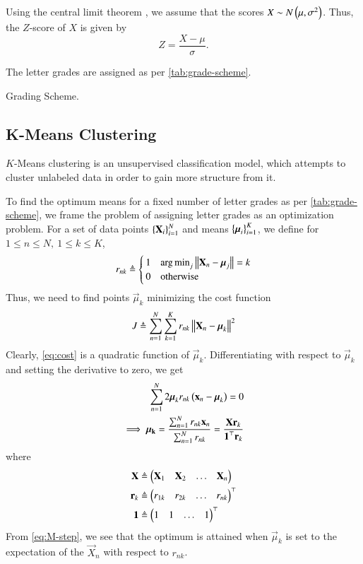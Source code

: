 \documentclass[conference]{IEEEtran}
\DeclareMathOperator*{\argmin}{arg\,min}
\begin{document}
Using the central limit theorem \cite{spiegelSchaumsOutlineStatistics2018}, we
assume that the scores $X \sim N\left(\mu,\sigma^2\right)$. Thus, the $Z$-score of $X$
is given by
\begin{equation}
    Z = \frac{X-\mu}{\sigma}.
\end{equation}

The letter grades are assigned as per \autoref{tab:grade-scheme}.
\begin{table}[!ht]
    \centering
    
    \caption{Grading Scheme.}
    \label{tab:grade-scheme}
\end{table}

\subsection{K-Means Clustering}
$K$-Means clustering is an unsupervised classification model, which attempts to
cluster unlabeled data in order to gain more structure from it. 

To find the optimum means for a fixed number of letter grades as per
\autoref{tab:grade-scheme}, we frame the problem of assigning letter grades as
an optimization problem. For a set of data points $\left\{\boldsymbol{\mathbf{X}}_i\right\}_{i=1}^N$
and means $\left\{\boldsymbol{\mathbf{\mu}}_i\right\}_{i=1}^K$, we define for $1 \le n \le N,\ 1 \le k
\le K$,
\begin{equation}
    r_{nk} \triangleq
    \begin{cases}
        1 & \argmin_{j}\norm{\vec{X}_n-\vec{\mu}_j} = k \\
        0 & \textrm{otherwise}
    \end{cases}
    \label{eq:rnk-def}
\end{equation}
Thus, we need to find points $\vec{\mu}_k$ minimizing the cost function
\begin{equation}
    J \triangleq \sum_{n=1}^N\sum_{k=1}^Kr_{nk}\left\lVert\boldsymbol{\mathbf{X}}_n-\boldsymbol{\mathbf{\mu}}_k\right\rVert^2
    \label{eq:cost}
\end{equation}
Clearly, \eqref{eq:cost} is a quadratic function of $\vec{\mu}_k$.
Differentiating with respect to $\vec{\mu}_k$ and setting the derivative to
zero, we get
\begin{align}
    \sum_{n=1}^N2\boldsymbol{\mathbf{\mu}}_kr_{nk}\left(\boldsymbol{\mathbf{x}}_n-\boldsymbol{\mathbf{\mu}}_k\right) = 0 \\
    \implies \boldsymbol{\mathbf{\mu_k}} = \frac{\sum_{n=1}^Nr_{nk}\boldsymbol{\mathbf{x}}_n}{\sum_{n=1}^Nr_{nk}} = \frac{\boldsymbol{\mathbf{Xr}}_k}{\boldsymbol{\mathbf{1}}^\top\boldsymbol{\mathbf{r}}_k}
    \label{eq:M-step}
\end{align}
where
\begin{align}
    \boldsymbol{\mathbf{X}} &\triangleq \begin{pmatrix}\boldsymbol{\mathbf{X}}_1&\boldsymbol{\mathbf{X}}_2&\ldots&\boldsymbol{\mathbf{X}}_n\end{pmatrix} \\
    \boldsymbol{\mathbf{r}}_k &\triangleq \begin{pmatrix}r_{1k}&r_{2k}&\ldots&r_{nk}\end{pmatrix}^\top \\
    \boldsymbol{\mathbf{1}} &\triangleq \begin{pmatrix}1&1&\ldots&1\end{pmatrix}^\top
    \label{eq:M-defs}
\end{align}
From \eqref{eq:M-step}, we see that the optimum is attained when $\vec{\mu}_k$
is set to the expectation of the $\vec{X}_n$ with respect to $r_{nk}$.
\end{document}
